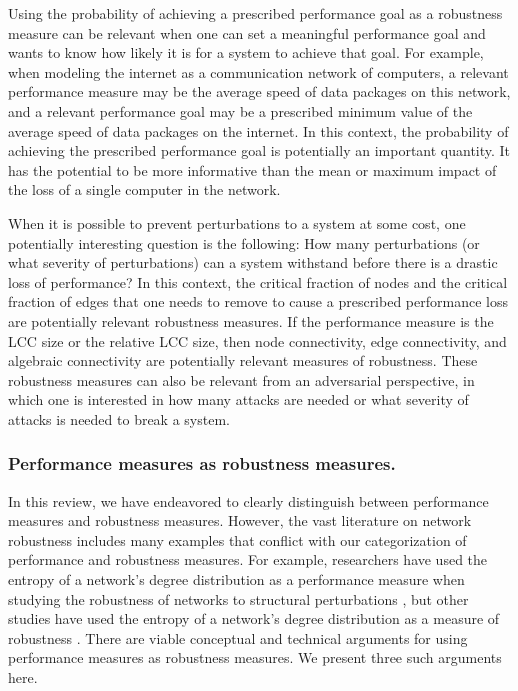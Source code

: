 \documentclass{comnet-mod}
\begin{document}
Using the probability of achieving a prescribed performance goal as a robustness measure can be relevant when one can set a meaningful performance goal and wants to know how likely it is for a system to achieve that goal. For example, when modeling the internet as a communication network of computers, a relevant performance measure may be the average speed of data packages on this network, and a relevant performance goal may be a prescribed minimum value of the average speed of data packages on the internet. 
In this context, the probability of achieving the prescribed performance goal is potentially an important quantity. It has the potential to be more informative than the mean or maximum impact of the loss of a single computer in the network.

When it is possible to prevent perturbations to a system at some cost, one potentially interesting question is the following: How many perturbations (or what severity of perturbations) can a system withstand before there is a drastic loss of performance? In this context, the critical fraction of nodes and the critical fraction of edges that one needs to remove to cause a prescribed performance loss are potentially relevant robustness measures. If the performance measure is the LCC size or the relative LCC size, then node connectivity, edge connectivity, and algebraic connectivity are potentially relevant measures of robustness. These robustness measures can also be relevant from an adversarial perspective, in which one is interested in how many attacks are needed or what severity of attacks is needed to break a system.


\subsubsection{Performance measures as robustness measures.}\label{sec:performance_ambiguity}

In this review, we have endeavored to clearly distinguish between performance measures and robustness measures.
However, the vast literature on network robustness includes many examples that conflict with our categorization of performance and robustness measures. For example, researchers have used the entropy of a network's degree distribution as a performance measure when studying the robustness of networks to structural perturbations \cite{Ventresca2014, Baehner2017, Jiang2019}, but other studies have used the entropy of a network's degree distribution as a measure of robustness \cite{Wang2006, Greco2012, Koc2013, Baehner2017}. There are viable conceptual and technical arguments for using performance measures as robustness measures. We present three such arguments here.
\end{document}
